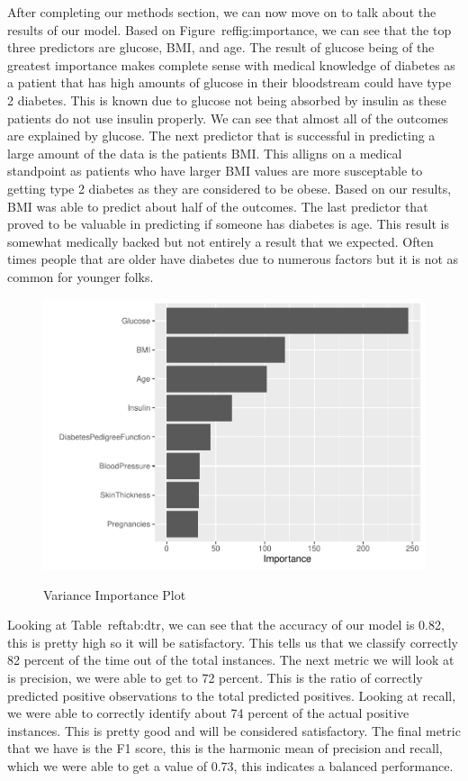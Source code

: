 \documentclass[12pt]{article}
\begin{document}
After completing our methods section, we can now move on to talk about the results of our model. Based on Figure~ref{fig:importance}, we can 
see that the top three predictors are glucose, BMI, and age. The result of glucose being of the greatest importance makes complete sense with 
medical knowledge of diabetes as a patient that has high amounts of glucose in their bloodstream could have type 2 diabetes. This is known due
to glucose not being absorbed by insulin as these patients do not use insulin properly. We can see that almost all of the outcomes are explained
by glucose. The next predictor that is successful in predicting a large amount of the data is the patients BMI. This alligns on a medical standpoint
as patients who have larger BMI values are more susceptable to getting type 2 diabetes as they are considered to be obese. Based on our results, BMI
was able to predict about half of the outcomes. The last predictor that proved to be valuable in predicting if someone has diabetes is age. This result
is somewhat medically backed but not entirely a result that we expected. Often times people that are older have diabetes due to numerous factors but it is 
not as common for younger folks.

\begin{figure}[tbp]
  \centering
  \caption{Variance Importance Plot}
  \includegraphics[width=\textwidth]{Variance Important.pdf}
  \label{fig:importance}
\end{figure}

Looking at Table~ref{tab:dtr}, we can see that the accuracy of our model is 0.82, this is pretty high so it will be satisfactory. This tells us that we 
classify correctly 82 percent of the time out of the total instances. The next metric we will look at is precision, we were able to get to 72 percent.
This is the ratio of correctly predicted positive observations to the total predicted positives. Looking at recall, we were able to correctly identify about
74 percent of the actual positive instances. This is pretty good and will be considered satisfactory. The final metric that we have is the F1 score, this is the
harmonic mean of precision and recall, which we were able to get a value of 0.73, this indicates a balanced performance.  
\end{document}
